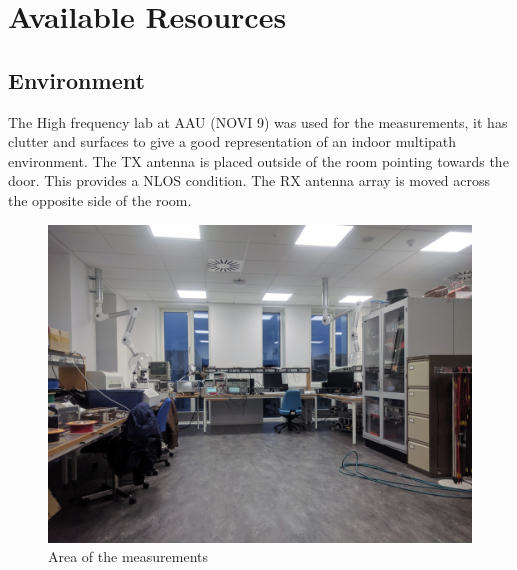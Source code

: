 \chapter{Available Resources}

\section{Environment} \label{Environment}
The High frequency lab at \gls{AAU} (NOVI 9) was used for the measurements, it has clutter and surfaces to give a good representation of an indoor multipath environment. The TX antenna is placed outside of the room pointing towards the door. This provides a \gls{NLOS} condition. The RX antenna array is moved across the opposite side of the room.


\begin{figure}[H]
  \centering
  \begin{minipage}[H]{0.48\textwidth}
    \includegraphics[width=\textwidth]{pictures/Measurement/walking_meas.jpg}
    \caption{Area of the measurements}
    \label{walk_area}
  \end{minipage}
  \hfill
  \begin{minipage}[H]{0.48\textwidth}

\end{minipage}
\end{figure}
